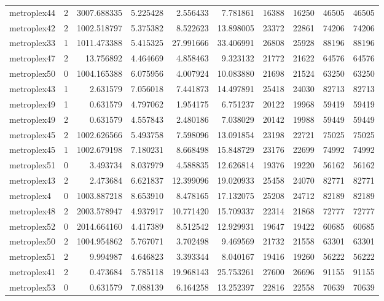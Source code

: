 \begin{longtable}{|l|r|r|r|r|r|r|r|r|r|}
metroplex44 & 2 & 3007.688335 & 5.225428 & 2.556433 & 7.781861 & 16388 & 16250 & 46505 & 46505 \\
metroplex42 & 2 & 1002.518797 & 5.375382 & 8.522623 & 13.898005 & 23372 & 22861 & 74206 & 74206 \\
metroplex33 & 1 & 1011.473388 & 5.415325 & 27.991666 & 33.406991 & 26808 & 25928 & 88196 & 88196 \\
metroplex47 & 2 & 13.756892 & 4.464669 & 4.858463 & 9.323132 & 21772 & 21622 & 64576 & 64576 \\
metroplex50 & 0 & 1004.165388 & 6.075956 & 4.007924 & 10.083880 & 21698 & 21524 & 63250 & 63250 \\
metroplex43 & 1 & 2.631579 & 7.056018 & 7.441873 & 14.497891 & 25418 & 24030 & 82713 & 82713 \\
metroplex49 & 1 & 0.631579 & 4.797062 & 1.954175 & 6.751237 & 20122 & 19968 & 59419 & 59419 \\
metroplex49 & 2 & 0.631579 & 4.557843 & 2.480186 & 7.038029 & 20142 & 19988 & 59449 & 59449 \\
metroplex45 & 2 & 1002.626566 & 5.493758 & 7.598096 & 13.091854 & 23198 & 22721 & 75025 & 75025 \\
metroplex45 & 1 & 1002.679198 & 7.180231 & 8.668498 & 15.848729 & 23176 & 22699 & 74992 & 74992 \\
metroplex51 & 0 & 3.493734 & 8.037979 & 4.588835 & 12.626814 & 19376 & 19220 & 56162 & 56162 \\
metroplex43 & 2 & 2.473684 & 6.621837 & 12.399096 & 19.020933 & 25458 & 24070 & 82771 & 82771 \\
metroplex4 & 0 & 1003.887218 & 8.653910 & 8.478165 & 17.132075 & 25208 & 24712 & 82189 & 82189 \\
metroplex48 & 2 & 2003.578947 & 4.937917 & 10.771420 & 15.709337 & 22314 & 21868 & 72777 & 72777 \\
metroplex52 & 0 & 2014.664160 & 4.417389 & 8.512542 & 12.929931 & 19647 & 19422 & 60685 & 60685 \\
metroplex50 & 2 & 1004.954862 & 5.767071 & 3.702498 & 9.469569 & 21732 & 21558 & 63301 & 63301 \\
metroplex51 & 2 & 9.994987 & 4.646823 & 3.393344 & 8.040167 & 19416 & 19260 & 56222 & 56222 \\
metroplex41 & 2 & 0.473684 & 5.785118 & 19.968143 & 25.753261 & 27600 & 26696 & 91155 & 91155 \\
metroplex53 & 0 & 0.631579 & 7.088139 & 6.164258 & 13.252397 & 22816 & 22558 & 70639 & 70639 \\

\end{longtable}
